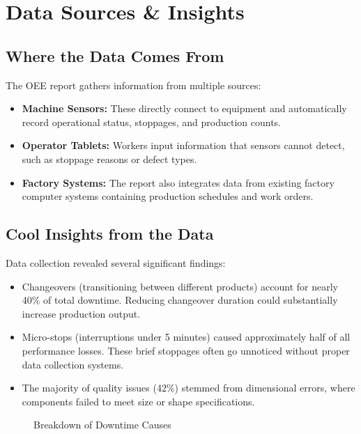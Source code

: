 \documentclass{article}
\begin{document}
\section{Data Sources \& Insights}

\subsection{Where the Data Comes From}
The OEE report gathers information from multiple sources:

\begin{itemize}
    \item \textbf{Machine Sensors:} These directly connect to equipment and automatically record operational status, stoppages, and production counts.
    
    \item \textbf{Operator Tablets:} Workers input information that sensors cannot detect, such as stoppage reasons or defect types.
    
    \item \textbf{Factory Systems:} The report also integrates data from existing factory computer systems containing production schedules and work orders.
\end{itemize}

\subsection{Cool Insights from the Data}

Data collection revealed several significant findings:

\begin{itemize}
    \item Changeovers (transitioning between different products) account for nearly 40\% of total downtime. Reducing changeover duration could substantially increase production output.
    
    \item Micro-stops (interruptions under 5 minutes) caused approximately half of all performance losses. These brief stoppages often go unnoticed without proper data collection systems.
    
    \item The majority of quality issues (42\%) stemmed from dimensional errors, where components failed to meet size or shape specifications.
\end{itemize}

\begin{figure}[H]
\centering
{}
\caption{Breakdown of Downtime Causes}
\end{figure}
\end{document}
